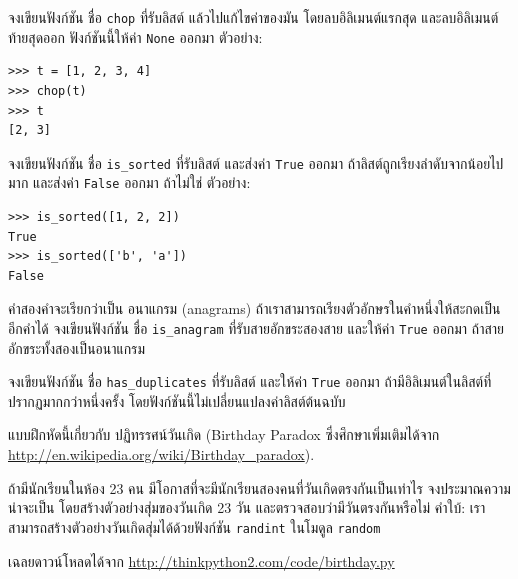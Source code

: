 \begin{exercise}

จงเขียนฟังก์ชัน ชื่อ \texttt{chop} ที่รับลิสต์ 
แล้วไปแก้ไขค่าของมัน โดยลบอิลิเมนต์แรกสุด และลบอิลิเมนต์ท้ายสุดออก
ฟังก์ชันนี้ให้ค่า \texttt{None} ออกมา
ตัวอย่าง:

\begin{verbatim}
>>> t = [1, 2, 3, 4]
>>> chop(t)
>>> t
[2, 3]
\end{verbatim}

\end{exercise}
\vspace{0.5cm}


\begin{exercise}
จงเขียนฟังก์ชัน ชื่อ \verb|is_sorted|
ที่รับลิสต์ 
และส่งค่า \texttt{True} ออกมา ถ้าลิสต์ถูกเรียงลำดับจากน้อยไปมาก
และส่งค่า \texttt{False} ออกมา ถ้าไม่ใช่  
ตัวอย่าง:

\begin{verbatim}
>>> is_sorted([1, 2, 2])
True
>>> is_sorted(['b', 'a'])
False
\end{verbatim}

\end{exercise}
\vspace{0.5cm}


\begin{exercise}
\label{anagram}

คำสองคำจะเรียกว่าเป็น อนาแกรม (anagrams) 
ถ้าเราสามารถเรียงตัวอักษรในคำหนึ่งให้สะกดเป็นอีกคำได้
จงเขียนฟังก์ชัน ชื่อ \verb|is_anagram|
ที่รับสายอักขระสองสาย และให้ค่า \texttt{True} ออกมา ถ้าสายอักขระทั้งสองเป็นอนาแกรม
\end{exercise}
\vspace{0.5cm}


\begin{exercise}
\label{duplicate}

จงเขียนฟังก์ชัน ชื่อ \verb|has_duplicates| 
ที่รับลิสต์ และให้ค่า \texttt{True} ออกมา
ถ้ามีอิลิเมนต์ในลิสต์ที่ปรากฏมากกว่าหนึ่งครั้ง
โดยฟังก์ชันนี้ไม่เปลี่ยนแปลงค่าลิสต์ต้นฉบับ

\end{exercise}
\vspace{0.5cm}


\begin{exercise}
แบบฝึกหัดนี้เกี่ยวกับ ปฏิทรรศน์วันเกิด (Birthday Paradox ซึ่งศึกษาเพิ่มเติมได้จาก \url{http://en.wikipedia.org/wiki/Birthday_paradox}).

ถ้ามีนักเรียนในห้อง 23 คน มีโอกาสที่จะมีนักเรียนสองคนที่วันเกิดตรงกันเป็นเท่าไร
จงประมาณความน่าจะเป็น โดยสร้างตัวอย่างสุ่มของวันเกิด 23 วัน และตรวจสอบว่ามีวันตรงกันหรือไม่
คำใบ้: เราสามารถสร้างตัวอย่างวันเกิดสุ่มได้ด้วยฟังก์ชัน \texttt{randint} ในโมดูล \texttt{random}

เฉลยดาวน์โหลดได้จาก \url{http://thinkpython2.com/code/birthday.py}

\end{exercise}
\vspace{0.5cm}


